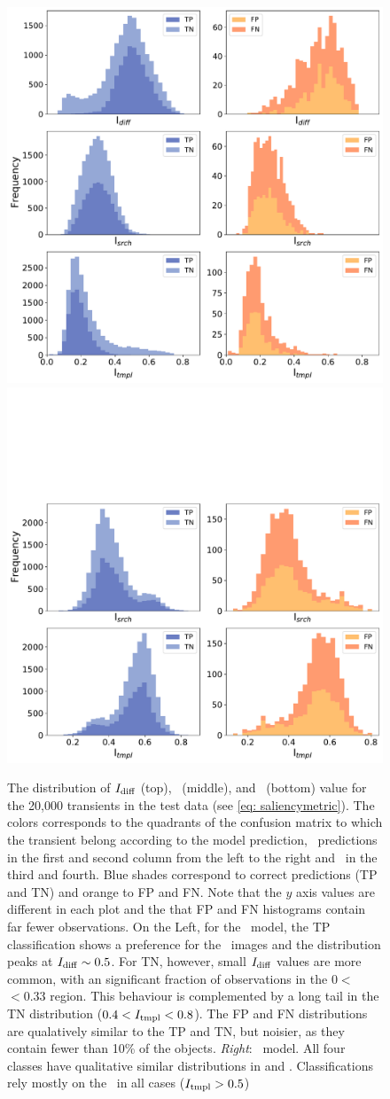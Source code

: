 \begin{figure}
    \centering
    \includegraphics[width=0.45\linewidth]{
    figures/histogram_sm_important_pixels_fed_shared.pdf}
    \includegraphics[width=0.45\linewidth]{
    figures/histogram_sm_important_pixels_2d_fed_shared.pdf}
    \caption{The distribution of  $I_\mathrm{diff}$ (top), \isearch\ (middle), and \itempl\ (bottom) value for the 20,000 transients in the test data (see \autoref{eq: saliencymetric}). The colors corresponds to the quadrants of the confusion matrix to which the transient belong according to the model prediction, \diabased\ predictions in the first and second column from the left to the right and \nodia\ in the third and fourth. Blue shades correspond to correct predictions (TP and TN) and orange to FP and FN. Note that the $y$ axis values are different in each plot and the that FP and FN histograms contain far fewer observations. On the {\itempl Left}, for the \diabased\ model, the TP classification shows a preference for the \diff\ images and the distribution peaks at $I_\mathrm{diff} \sim 0.5$. For TN, however, small $I_\mathrm{diff}$ values are more common, with an significant fraction of observations in the $0<$\idiff$<0.33$ region. This behaviour is complemented by a long \itempl tail in the TN distribution ($0.4<I_\mathrm{tmpl}<0.8$). The FP and FN distributions are qualatively similar to the TP and TN, but noisier, as they contain fewer than 10\% of the objects. {\it Right}: \nodia\ model. All four classes have qualitative similar distributions in \itempl and \isearch. Classifications rely mostly on the \temp\ in all cases ($I_\mathrm{tmpl} > 0.5$)}
    \label{fig:histo_saliency}
\end{figure}


